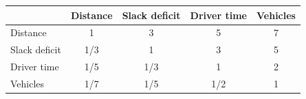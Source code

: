 \begin{tabular}{@{}lcccc@{}}
\toprule
 & Distance & Slack deficit & Driver time & Vehicles\\
\midrule
Distance & 1 & 3 & 5 & 7\\
Slack deficit & 1/3 & 1 & 3 & 5\\
Driver time & 1/5 & 1/3 & 1 & 2\\
Vehicles & 1/7 & 1/5 & 1/2 & 1\\
\bottomrule
\end{tabular}
